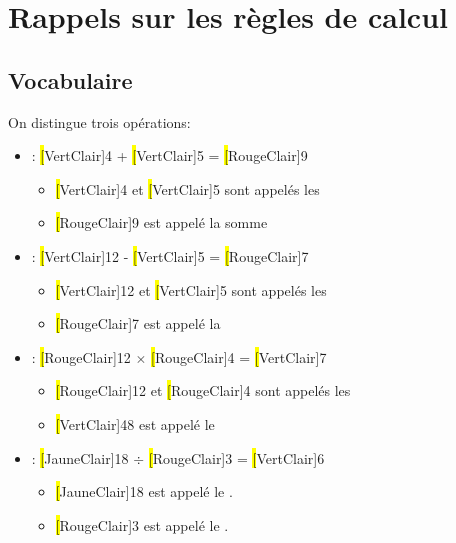 \section{Rappels sur les règles de calcul}
\subsection{Vocabulaire}
\begin{definitionbox}
    On distingue trois opérations:
    \begin{itemize}[label=\textbullet]

        \item {} : \hl[VertClair]{4} + \hl[VertClair]{5} = \hl[RougeClair]{9}
            \begin{itemize}[label=\textbullet]
                \item \hl[VertClair]{4} et \hl[VertClair]{5} sont
                    appelés les 
                \item \hl[RougeClair]{9} est appelé la somme
            \end{itemize} 


        \item {}: \hl[VertClair]{12} - \hl[VertClair]{5}
            = \hl[RougeClair]{7}
            \begin{itemize}[label=\textbullet]
                \item \hl[VertClair]{12} et \hl[VertClair]{5} sont
                    appelés les 
                \item \hl[RougeClair]{7} est appelé la 
            \end{itemize} 

        \item {}: \hl[RougeClair]{12} $\times$ \hl[RougeClair]{4}
            = \hl[VertClair]{7}
            \begin{itemize}[label=\textbullet]
                \item \hl[RougeClair]{12} et \hl[RougeClair]{4} sont
                    appelés les 
                \item \hl[VertClair]{48} est appelé le
            \end{itemize} 

        \item {} : \hl[JauneClair]{18} $\div$
            \hl[RougeClair]{3} = \hl[VertClair]{6}
            \begin{itemize}[label=\textbullet]
                \item \hl[JauneClair]{18} est appelé le
                    .
                \item \hl[RougeClair]{3} est 
                    appelé le .


\end{itemize}
\end{itemize}
\end{definitionbox}
